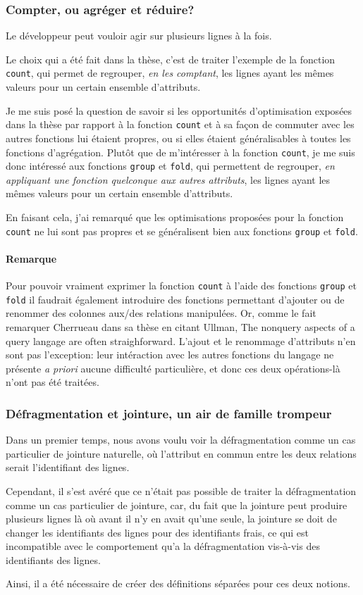 \subsubsection*{Compter, ou agréger et réduire?}
Le développeur peut vouloir agir sur plusieurs lignes à la fois.

Le choix qui a été fait dans la thèse, c'est de traiter l'exemple
de la fonction \lstinline|count|, qui permet de regrouper, \emph{en les comptant},
les lignes ayant les mêmes valeurs pour un certain ensemble d'attributs.

Je me suis posé la question de savoir si les opportunités d'optimisation
exposées dans la thèse par rapport à la fonction \lstinline|count| et à sa façon de commuter
avec les autres fonctions lui étaient propres, ou si elles étaient généralisables
à toutes les fonctions d'agrégation. Plutôt que de m'intéresser à la fonction
\lstinline|count|, je me suis donc intéressé
aux fonctions \lstinline|group| et \lstinline|fold|, qui permettent
de regrouper, \emph{en appliquant une fonction quelconque aux autres attributs},
les lignes ayant les mêmes valeurs pour un certain ensemble d'attributs.

En faisant cela, j'ai remarqué que les optimisations proposées pour la fonction
\lstinline|count| ne lui sont pas propres et se généralisent bien aux
fonctions \lstinline|group| et \lstinline|fold|.

\paragraph*{Remarque}
Pour pouvoir vraiment exprimer la fonction \lstinline|count|
à l'aide des fonctions \lstinline|group| et \lstinline|fold|
il faudrait également introduire des fonctions permettant d'ajouter ou de
renommer des colonnes aux/des relations manipulées.
Or, comme le fait remarquer Cherrueau dans sa thèse en citant Ullman,
\og The nonquery aspects of a query langage are often straighforward\fg{}.
L'ajout et le renommage d'attributs n'en sont pas l'exception:
leur intéraction avec les autres fonctions du langage ne présente
\emph{a priori} aucune difficulté particulière, et donc ces deux opérations-là
n'ont pas été traitées.

\subsubsection*{Défragmentation et jointure, un air de famille trompeur}
Dans un premier temps, nous avons voulu voir la défragmentation comme un cas
particulier de jointure naturelle, où l'attribut en commun entre
les deux relations serait l'identifiant
des lignes.

Cependant, il s'est avéré que ce n'était pas possible de traiter la défragmentation
comme un cas particulier de jointure, car, du fait que la jointure
peut produire plusieurs lignes là où avant il n'y en avait qu'une seule,
la jointure se doit de changer les identifiants des lignes pour des identifiants frais,
ce qui est incompatible avec le comportement qu'a la défragmentation
vis-à-vis des identifiants des lignes.

Ainsi, il a été nécessaire de créer des définitions séparées pour ces deux notions.

